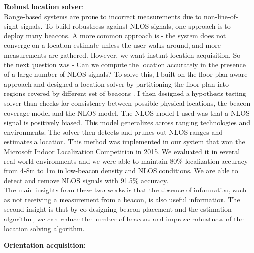 \documentclass[10pt]{article}
\begin{document}
\textbf{Robust location solver}:\\
Range-based systems are prone to incorrect measurements due to non-line-of-sight signals. To build robustness against NLOS signals, one approach is to deploy many beacons. A more common approach is - the system does not converge on a location estimate unless the user walks around, and more measurements are gathered. However, we want instant location acquisition. So the next question was - Can we compute the location accurately in the presence of a large number of NLOS signals? To solve this, I built on the floor-plan aware approach and designed a location solver by partitioning the floor plan into regions covered by different set of beacons \cite{rajagopal2018enhancing
}. I then designed a hypothesis testing solver than checks for consistency between possible physical locations, the beacon coverage model and the NLOS model. The NLOS model I used was that a NLOS signal is positively biased. This model generalizes across ranging technologies and environments. %
The solver then detects and prunes out NLOS ranges and estimates a location. This method was implemented in our system that won the Microsoft Indoor Localization Competition in 2015. We evaluated it in several real world environments and we were able to maintain 80\% localization accuracy from 4-8m to 1m in low-beacon density and NLOS conditions. We are able to detect and remove NLOS signals with 91.5\% accuracy.\\

The main insights from these two works is that the absence of information, such as not receiving a measurement from a beacon, is also useful information. The second insight is that by co-designing beacon placement and the estimation algorithm, we can reduce the number of beacons and improve robustness of the location solving algorithm.

\textbf{Orientation acquisition:}\\
\end{document}
